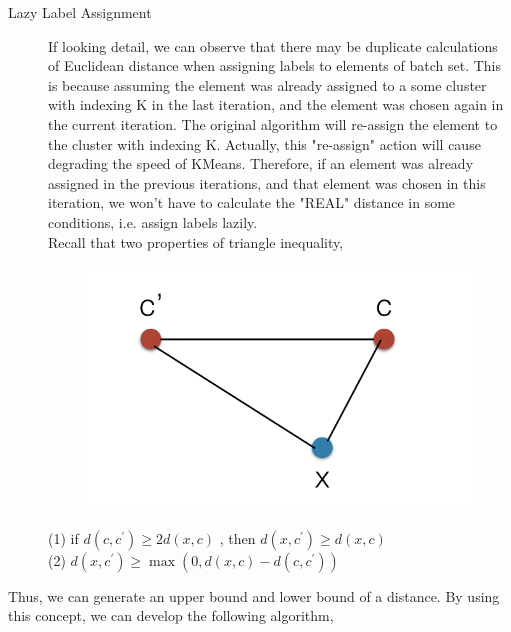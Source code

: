 \documentclass[final,leqno,onefignum,onetabnum]{siamltexmm}
\begin{document}
\begin{description}
\begin{verbatim}
\end{verbatim}

\item[Lazy Label Assignment]

If looking detail, we can observe that there may be duplicate calculations of Euclidean distance when assigning labels to elements of batch set. This is because assuming the element was already assigned to a some cluster with indexing K in the last iteration, and the element was chosen again in the current iteration. The original algorithm will re-assign the element to the cluster with indexing K. Actually, this "re-assign" action will cause degrading the speed of KMeans. Therefore, if an element was already assigned in the previous iterations, and that element was chosen in this iteration, we won't have to calculate the "REAL" distance in some conditions, i.e. assign labels lazily. \\

Recall that two properties of triangle inequality, \\
\begin{center}
	\begin{figure}[H]
		\centering
		\includegraphics[scale=0.8]{triangle.jpg}
	\end{figure}
\end{center}
(1) if $d(c,c^{'}) \geq 2d(x,c)$ , then $d(x,c^{'}) \geq d(x,c)$ \\
(2) $d(x,c^{'}) \geq \max(0,d(x,c)-d(c,c^{'}))$ \\
\end{description}
Thus, we can generate an upper bound and lower bound of a distance. By using this concept, we can develop the following algorithm, \\
\end{document}
